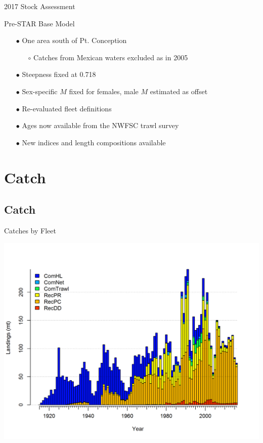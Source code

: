 \documentclass[ignorenonframetext,compress]{beamer}
\begin{document}
\begin{frame}{2017 Stock Assessment}

Pre-STAR Base Model

\begin{itemize}
\item[$\bullet$] One area south of Pt. Conception 
\begin{itemize}
\item[$\circ$] Catches from Mexican waters excluded as in 2005
\end{itemize}
\item[$\bullet$] Steepness fixed at 0.718
\item[$\bullet$] Sex-specific $M$ fixed for females, male $M$ estimated as offset
\item[$\bullet$] Re-evaluated fleet definitions
\item[$\bullet$] Ages now available from the NWFSC trawl survey
\item[$\bullet$] New indices and length compositions available
\end{itemize}

\end{frame}

\section{Catch}\label{catch}

\subsection{Catch}\label{catch-1}

\begin{frame}{Catches by Fleet}

\centering
\includegraphics{r4ss/plots_mod1/catch2 landings stacked.png}

\end{frame}
\end{document}
